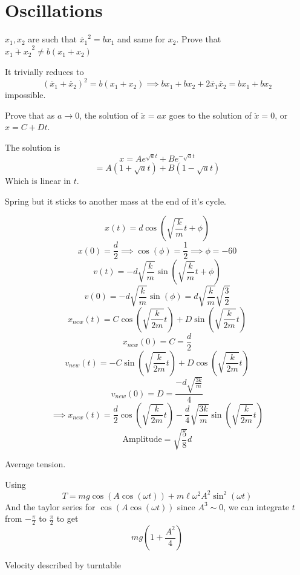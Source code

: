 \documentclass[11pt]{scrartcl}
\newcommand{\ca}[1]{\mathrm{#1}}
\begin{document}
\section{Oscillations}
\begin{example}
  [4.1]
  $x_1,x_2$ are such that $\ddot{x_1}^2=bx_1$ and same for $x_2$. Prove that $\ddot{x_1+x_2}^2\ne b(x_1+x_2)$
\end{example}
\begin{soln}
  It trivially reduces to $$(\ddot{x_1}+\ddot{x_2})^2=b(x_1+x_2)\implies bx_1+bx_2+2\ddot{x_1}\ddot{x_2}=bx_1+bx_2$$
  impossible.
\end{soln}
\begin{example}
  [4.2]
  Prove that as $a\to 0$, the solution of $\ddot{x}=ax$ goes to the solution of $\ddot{x}=0$, or $x=C+Dt$.
\end{example}
\begin{soln}
  The solution is
  $$x=Ae^{\sqrt{a}t}+Be^{-\sqrt{a}t}$$
  $$=A(1+\sqrt{a}t)+B(1-\sqrt{a}t)$$
  Which is linear in $t$.
\end{soln}
\begin{example}
  [4.3]
  Spring but it sticks to another mass at the end of it's cycle.
\end{example}
\begin{soln}
  $$x(t)=d\cos(\sqrt{\frac{k}{m}}t+\phi)$$
  $$x(0)=\frac{d}{2}\implies \cos(\phi)=\frac12\implies \phi=-60$$
  $$v(t)=-d\sqrt{\frac{k}{m}}\sin(\sqrt{\frac{k}{m}}t+\phi)$$
  $$v(0)=-d\sqrt{\frac{k}{m}}\sin(\phi)=d\sqrt{\frac{k}{m}}\sqrt{\frac32}$$
  $$x_{new}(t)=C\cos(\sqrt{\frac{k}{2m}}t)+D\sin(\sqrt{\frac{k}{2m}}t)$$
  $$x_{new}(0)=C=\frac{d}{2}$$
  $$v_{new}(t)=-C\sin(\sqrt{\frac{k}{2m}}t)+D\cos(\sqrt{\frac{k}{2m}}t)$$
  $$v_{new}(0)=D=\frac{-d\sqrt{\frac{3k}{m}}}{4}$$
  $$\implies x_{new}(t)=\frac{d}{2}\cos(\sqrt{\frac{k}{2m}}t)-\frac{d}{4}\sqrt{\frac{3k}{m}}\sin(\sqrt{\frac{k}{2m}}t)$$
  $$\ca{Amplitude}=\sqrt{\frac58}d$$
\end{soln}
\begin{example}
  [4.4]
  Average tension.
\end{example}
\begin{soln}
  Using
  $$T=mg\cos(A\cos(\omega t))+m\ell \omega^2 A^2\sin^2(\omega t)$$
  And the taylor series for $\cos(A\cos(\omega t))$ since $A^3\sim 0$,
  we can integrate $t$ from $-\frac{\pi}{2}$ to $\frac{\pi}{2}$ to get
  $$mg\left(1+\frac{A^2}{4}\right)$$
\end{soln}
\begin{example}
  [4.5]
  Velocity described by turntable
\end{example}
\end{document}
